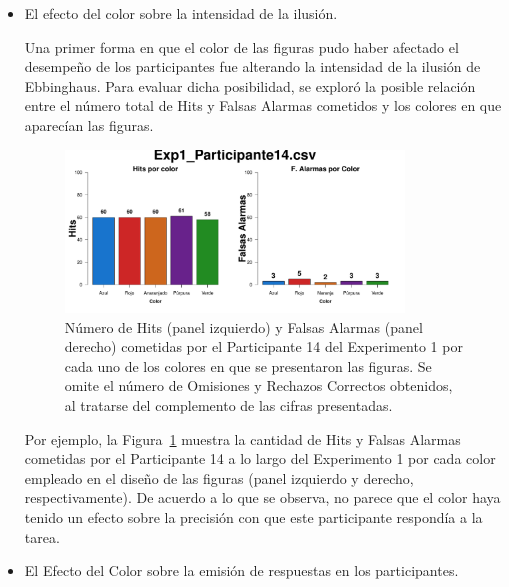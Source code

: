 \begin{itemize}
	\item El efecto del color sobre la intensidad de la ilusión.

Una primer forma en que el color de las figuras pudo haber afectado el desempeño de los participantes fue alterando la intensidad de la ilusión de Ebbinghaus. Para evaluar dicha posibilidad, se exploró la posible relación entre el número total de Hits y Falsas Alarmas cometidos y los colores en que aparecían las figuras.\\

\begin{figure}[th]
\centering
\includegraphics[width=0.85\textwidth]{Figures/Color_Exp1_P14}
\caption[Hits y Falsas Alarmas por Color; Ejemplo]{Número de Hits (panel izquierdo) y Falsas Alarmas (panel derecho) cometidas por el Participante 14 del Experimento 1 por cada uno de los colores en que se presentaron las figuras. Se omite el número de Omisiones y Rechazos Correctos obtenidos, al tratarse del complemento de las cifras presentadas.}
\label{fig:Color_E1_P14}
\end{figure}

Por ejemplo, la Figura~\ref{fig:Color_E1_P14} muestra la cantidad de Hits y Falsas Alarmas cometidas por el Participante 14 a lo largo del Experimento 1 por cada color empleado en el diseño de las figuras (panel izquierdo y derecho, respectivamente). De acuerdo a lo que se observa, no parece que el color haya tenido un efecto sobre la precisión con que este participante respondía a la tarea.\\


	\item El Efecto del Color sobre la emisión de respuestas en los participantes.


\end{itemize}
